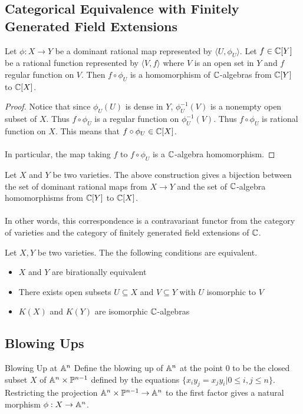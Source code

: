 \documentclass[a4paper]{article}
\begin{document}
\subsection{Categorical Equivalence with Finitely Generated Field Extensions}
\begin{prp}{}{} Let $\phi:X\to Y$ be a dominant rational map represented by $\langle U,\phi_U\rangle$. Let $f\in \mathbb{C}[Y]$ be a rational function represented by $\langle V,f\rangle$ where $V$ is an open set in $Y$ and $f$ regular function on $V$. Then $f\circ\phi_U$ is a homomorphism of $\mathbb{C}$-algebras from $\mathbb{C}[Y]$ to $\mathbb{C}[X]$. \tcbline
\begin{proof}
Notice that since $\phi_U(U)$ is dense in $Y$, $\phi_U^{-1}(V)$ is a nonempty open subset of $X$. Thus $f\circ\phi_U$ is a regular function on $\phi_U^{-1}(V)$. Thus $f\circ\phi_U$ is rational function on $X$. This means that $f\circ\phi_U\in\mathbb{C}[X]$. \\~\\
In particular, the map taking $f$ to $f\circ\phi_U$ is a $\mathbb{C}$-algebra homomorphism. 
\end{proof}
\end{prp}

\begin{thm}{}{} Let $X$ and $Y$ be two varieties. The above construction gives a bijection between the set of dominant rational maps from $X\to Y$ and the set of $\mathbb{C}$-algebra homomorphisms from $\mathbb{C}[Y]$ to $\mathbb{C}[X]$. \\~\\
In other words, this correspondence is a contravariant functor from the category of varieties and the category of finitely generated field extensions of $\mathbb{C}$. 
\end{thm}

\begin{crl}{}{} Let $X,Y$ be two varieties. The the following conditions are equivalent. 
\begin{itemize}
\item $X$ and $Y$ are birationally equivalent
\item There exists open subsets $U\subseteq X$ and $V\subseteq Y$ with $U$ isomorphic to $V$
\item $K(X)$ and $K(Y)$ are isomorphic $\mathbb{C}$-algebras
\end{itemize}
\end{crl}

\subsection{Blowing Ups}
\begin{defn}{Blowing Up at $\mathbb{A}^n$}{} Define the blowing up of $\mathbb{A}^n$ at the point $0$ to be the closed subset $X$ of $\mathbb{A}^n\times\mathbb{P}^{n-1}$ defined by the equations $\{x_iy_j=x_jy_i|0\leq i,j\leq n\}$. Restricting the projection $\mathbb{A}^n\times\mathbb{P}^{n-1}\to\mathbb{A}^n$ to the first factor gives a natural morphism $\phi:X\to\mathbb{A}^n$. 
\end{defn}
\end{document}

